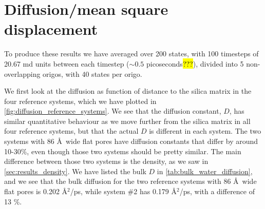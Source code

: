 \section{Diffusion/mean square displacement}




To produce these results we have averaged over 200 states, with 100 timesteps of 20.67 md units between each timestep ($\sim 0.5$ picoseconds\hl{???}), divided into 5 non-overlapping origos, with 40 states per origo.

We first look at the diffusion as function of distance to the silica matrix in the four reference systems, which we have plotted in \cref{fig:diffusion_reference_systems}. We see that the diffusion constant, $D$, has similar quantitative behaviour as we move further from the silica matrix in all four reference systems, but that the actual $D$ is different in each system. The two systems with 86 \AA\ wide flat pores have diffusion constants that differ by around 10-30\%, even though those two systems should be pretty similar. The main difference between those two systems is the density, as we saw in \cref{sec:results_density}. We have listed the bulk $D$ in \cref{tab:bulk_water_diffusion}, and we see that the bulk diffusion for the two reference systems with 86 \AA\ wide flat pores is {0.202 \AA$^2$/ps}, while system \#2 has {0.179 \AA$^2$/ps}, with a difference of {13 \%}.
%
%


